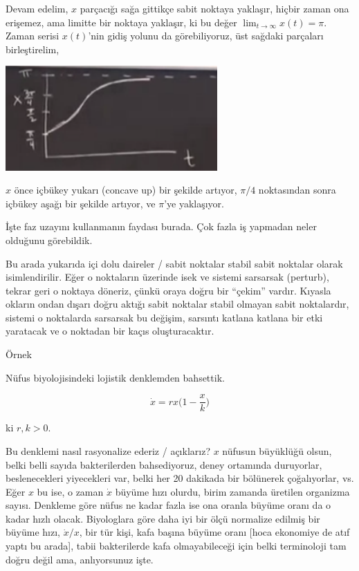 \documentclass[12pt,fleqn]{article}\usepackage{../../common}
\begin{document}
Devam edelim, $x$ parçacığı sağa gittikçe sabit noktaya yaklaşır, hiçbir
zaman ona erişemez, ama limitte bir noktaya yaklaşır, ki bu değer $\lim_{t
  \to \infty} x(t) = \pi$. Zaman serisi $x(t)$'nin gidiş yolunu da
görebiliyoruz,  üst sağdaki parçaları birleştirelim, 

\includegraphics[height=4cm]{1_07.png}

$x$ önce içbükey yukarı (concave up) bir şekilde artıyor, $\pi/4$
noktasından sonra içbükey aşağı bir şekilde artıyor, ve $\pi$'ye
yaklaşıyor. 

İşte faz uzayını kullanmanın faydası burada. Çok fazla iş yapmadan neler
olduğunu görebildik. 

Bu arada yukarıda içi dolu daireler / sabit noktalar stabil sabit noktalar
olarak isimlendirilir. Eğer o noktaların üzerinde isek ve sistemi sarsarsak
(perturb), tekrar geri o noktaya döneriz, çünkü oraya doğru bir ``çekim''
vardır. Kıyasla okların ondan dışarı doğru aktığı sabit noktalar stabil
olmayan sabit noktalardır, sistemi o noktalarda sarsarsak bu değişim,
sarsıntı katlana katlana bir etki yaratacak ve o noktadan bir kaçıs
oluşturacaktır.

Örnek

Nüfus biyolojisindeki lojistik denklemden bahsettik. 

$$ \dot{x} = rx \big( 1- \frac{x}{k}\big) $$

ki $r,k > 0$. 

Bu denklemi nasıl rasyonalize ederiz / açıklarız? $x$ nüfusun büyüklüğü
olsun, belki belli sayıda bakterilerden bahsediyoruz, deney ortamında
duruyorlar, beslenecekleri yiyecekleri var, belki her 20 dakikada bir
bölünerek çoğalıyorlar, vs. Eğer $x$ bu ise, o zaman $\dot{x}$ büyüme hızı
olurdu, birim zamanda üretilen organizma sayısı. Denkleme göre nüfus ne
kadar fazla ise ona oranla büyüme oranı da o kadar hızlı
olacak. Biyologlara göre daha iyi bir ölçü normalize edilmiş bir büyüme
hızı, $\dot{x}/x$, bir tür kişi, kafa başına büyüme oranı [hoca ekonomiye
de atıf yaptı bu arada], tabii bakterilerde kafa olmayabileceği için belki
terminoloji tam doğru değil ama, anlıyorsunuz işte.  
\end{document}
